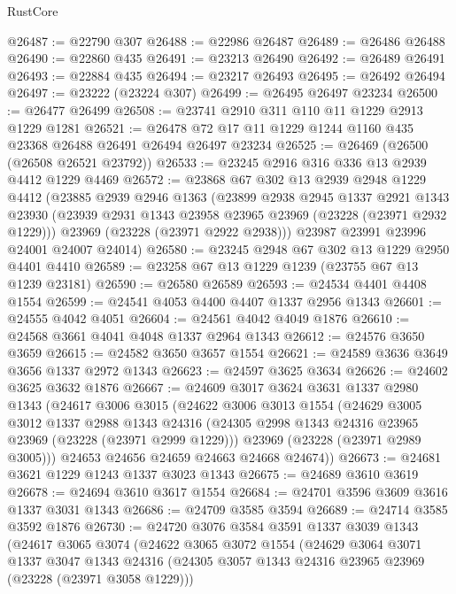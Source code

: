 \begin{lexlean}{RustCore}
\begin{coremodule}
@26487 := @22790 @307
@26488 := @22986 @26487
@26489 := @26486 @26488
@26490 := @22860 @435
@26491 := @23213 @26490
@26492 := @26489 @26491
@26493 := @22884 @435
@26494 := @23217 @26493
@26495 := @26492 @26494
@26497 := @23222 (@23224 @307)
@26499 := @26495 @26497 @23234
@26500 := @26477 @26499
@26508 := @23741 @2910 @311 @110 @11 @1229 @2913 @1229 @1281
@26521 := @26478 @72 @17 @11 @1229 @1244 @1160 @435 @23368 @26488 @26491 @26494 @26497 @23234
@26525 := @26469 (@26500 (@26508 @26521 @23792))
@26533 := @23245 @2916 @316 @336 @13 @2939 @4412 @1229 @4469
@26572 := @23868
    @67
    @302
    @13
    @2939
    @2948
    @1229
    @4412
    (@23885
      @2939
      @2946
      @1363
      (@23899
        @2938
        @2945
        @1337
        @2921
        @1343
        @23930
        (@23939 @2931 @1343 @23958 @23965 @23969 (@23228 (@23971 @2932 @1229)))
        @23969
        (@23228 (@23971 @2922 @2938)))
      @23987
      @23991
      @23996
      @24001
      @24007
      @24014)
@26580 := @23245 @2948 @67 @302 @13 @1229 @2950 @4401 @4410
@26589 := @23258 @67 @13 @1229 @1239 (@23755 @67 @13 @1239 @23181)
@26590 := @26580 @26589
@26593 := @24534 @4401 @4408 @1554
@26599 := @24541 @4053 @4400 @4407 @1337 @2956 @1343
@26601 := @24555 @4042 @4051
@26604 := @24561 @4042 @4049 @1876
@26610 := @24568 @3661 @4041 @4048 @1337 @2964 @1343
@26612 := @24576 @3650 @3659
@26615 := @24582 @3650 @3657 @1554
@26621 := @24589 @3636 @3649 @3656 @1337 @2972 @1343
@26623 := @24597 @3625 @3634
@26626 := @24602 @3625 @3632 @1876
@26667 := @24609
    @3017
    @3624
    @3631
    @1337
    @2980
    @1343
    (@24617
      @3006
      @3015
      (@24622
        @3006
        @3013
        @1554
        (@24629
          @3005
          @3012
          @1337
          @2988
          @1343
          @24316
          (@24305 @2998 @1343 @24316 @23965 @23969 (@23228 (@23971 @2999 @1229)))
          @23969
          (@23228 (@23971 @2989 @3005)))
        @24653
        @24656
        @24659
        @24663
        @24668
        @24674))
@26673 := @24681 @3621 @1229 @1243 @1337 @3023 @1343
@26675 := @24689 @3610 @3619
@26678 := @24694 @3610 @3617 @1554
@26684 := @24701 @3596 @3609 @3616 @1337 @3031 @1343
@26686 := @24709 @3585 @3594
@26689 := @24714 @3585 @3592 @1876
@26730 := @24720
    @3076
    @3584
    @3591
    @1337
    @3039
    @1343
    (@24617
      @3065
      @3074
      (@24622
        @3065
        @3072
        @1554
        (@24629
          @3064
          @3071
          @1337
          @3047
          @1343
          @24316
          (@24305 @3057 @1343 @24316 @23965 @23969 (@23228 (@23971 @3058 @1229)))

\end{coremodule}
\end{lexlean}
